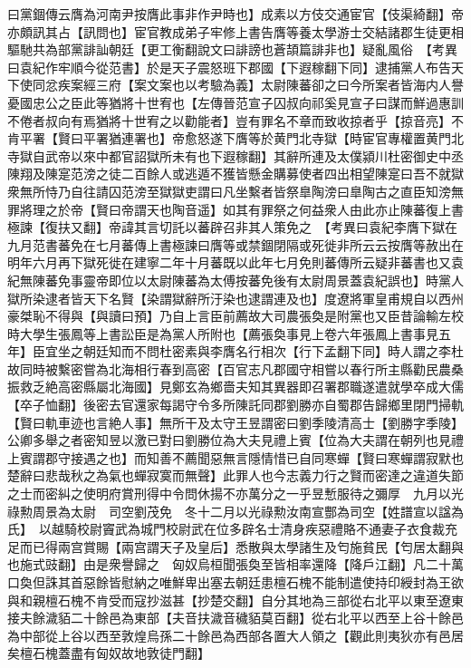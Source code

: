 曰黨錮傳云膺為河南尹按膺此事非作尹時也】成素以方伎交通宦官【伎渠綺翻】帝亦頗訊其占【訊問也】宦官教成弟子牢修上書告膺等養太學游士交結諸郡生徒更相驅馳共為部黨誹訕朝廷【更工衡翻說文曰誹謗也蒼頡篇誹非也】疑亂風俗　【考異曰袁紀作牢順今從范書】於是天子震怒班下郡國【下遐稼翻下同】逮捕黨人布告天下使同忿疾案經三府【案文案也以考驗為義】太尉陳蕃卻之曰今所案者皆海内人譽憂國忠公之臣此等猶將十世宥也【左傳晉范宣子囚叔向祁奚見宣子曰謀而鮮過惠訓不倦者叔向有焉猶將十世宥之以勸能者】豈有罪名不章而致收掠者乎【掠音亮】不肯平署【賢曰平署猶連署也】帝愈怒遂下膺等於黄門北寺獄【時宦官專權置黄門北寺獄自武帝以來中都官詔獄所未有也下遐稼翻】其辭所連及太僕潁川杜密御史中丞陳翔及陳寔范滂之徒二百餘人或逃遁不獲皆懸金購募使者四出相望陳寔曰吾不就獄衆無所恃乃自往請囚范滂至獄獄吏謂曰凡坐繫者皆祭臯陶滂曰臯陶古之直臣知滂無罪將理之於帝【賢曰帝謂天也陶音遥】如其有罪祭之何益衆人由此亦止陳蕃復上書極諫【復扶又翻】帝諱其言切託以蕃辟召非其人策免之　【考異曰袁紀李膺下獄在九月范書蕃免在七月蕃傳上書極諫曰膺等或禁錮閉隔或死徙非所云云按膺等赦出在明年六月再下獄死徙在建寧二年十月蕃既以此年七月免則蕃傳所云疑非蕃書也又袁紀無陳蕃免事靈帝即位以太尉陳蕃為太傅按蕃免後有太尉周景蓋袁紀誤也】時黨人獄所染逮者皆天下名賢【染謂獄辭所汙染也逮謂連及也】度遼將軍皇甫規自以西州豪桀恥不得與【與讀曰預】乃自上言臣前薦故大司農張奐是附黨也又臣昔論輸左校時大學生張鳳等上書訟臣是為黨人所附也【薦張奐事見上卷六年張鳳上書事見五年】臣宜坐之朝廷知而不問杜密素與李膺名行相次【行下孟翻下同】時人謂之李杜故同時被繫密嘗為北海相行春到高密【百官志凡郡國守相嘗以春行所主縣勸民農桑振救乏絶高密縣屬北海國】見鄭玄為鄉嗇夫知其異器即召署郡職遂遣就學卒成大儒【卒子恤翻】後密去官還家每謁守令多所陳託同郡劉勝亦自蜀郡告歸鄉里閉門掃軌【賢曰軌車迹也言絶人事】無所干及太守王昱謂密曰劉季陵清高士【劉勝字季陵】公卿多舉之者密知昱以激已對曰劉勝位為大夫見禮上賓【位為大夫謂在朝列也見禮上賓謂郡守接遇之也】而知善不薦聞惡無言隱情惜已自同寒蟬【賢曰寒蟬謂寂默也楚辭曰悲哉秋之為氣也蟬寂寞而無聲】此罪人也今志義力行之賢而密達之違道失節之士而密糾之使明府賞刑得中令問休揚不亦萬分之一乎昱慙服待之彌厚　九月以光祿勲周景為太尉　司空劉茂免　冬十二月以光祿勲汝南宣酆為司空【姓譜宣以諡為氏】　以越騎校尉竇武為城門校尉武在位多辟名士清身疾惡禮賂不通妻子衣食裁充足而已得兩宫賞賜【兩宫謂天子及皇后】悉散與太學諸生及匄施貧民【匄居太翻與也施式豉翻】由是衆譽歸之　匈奴烏桓聞張奐至皆相率還降【降戶江翻】凡二十萬口奐但誅其首惡餘皆慰納之唯鮮卑出塞去朝廷患檀石槐不能制遣使持印綬封為王欲與和親檀石槐不肯受而寇抄滋甚【抄楚交翻】自分其地為三部從右北平以東至遼東接夫餘濊貊二十餘邑為東部【夫音扶濊音穢貊莫百翻】從右北平以西至上谷十餘邑為中部從上谷以西至敦煌烏孫二十餘邑為西部各置大人領之【觀此則夷狄亦有邑居矣檀石槐蓋盡有匈奴故地敦徒門翻】

